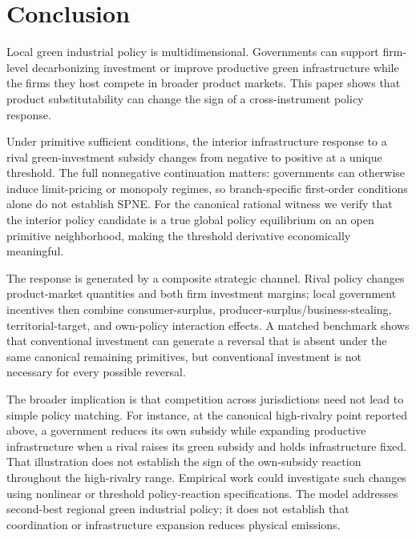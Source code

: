 \section{Conclusion}
\label{sec:conclusion}

Local green industrial policy is multidimensional. Governments can support firm-level decarbonizing investment or improve productive green infrastructure while the firms they host compete in broader product markets. This paper shows that product substitutability can change the sign of a cross-instrument policy response.

Under primitive sufficient conditions, the interior infrastructure response to a rival green-investment subsidy changes from negative to positive at a unique threshold. The full nonnegative continuation matters: governments can otherwise induce limit-pricing or monopoly regimes, so branch-specific first-order conditions alone do not establish SPNE. For the canonical rational witness we verify that the interior policy candidate is a true global policy equilibrium on an open primitive neighborhood, making the threshold derivative economically meaningful.

The response is generated by a composite strategic channel. Rival policy changes product-market quantities and both firm investment margins; local government incentives then combine consumer-surplus, producer-surplus/business-stealing, territorial-target, and own-policy interaction effects. A matched benchmark shows that conventional investment can generate a reversal that is absent under the same canonical remaining primitives, but conventional investment is not necessary for every possible reversal.

The broader implication is that competition across jurisdictions need not lead to simple policy matching. For instance, at the canonical high-rivalry point reported above, a government reduces its own subsidy while expanding productive infrastructure when a rival raises its green subsidy and holds infrastructure fixed. That illustration does not establish the sign of the own-subsidy reaction throughout the high-rivalry range. Empirical work could investigate such changes using nonlinear or threshold policy-reaction specifications. The model addresses second-best regional green industrial policy; it does not establish that coordination or infrastructure expansion reduces physical emissions.